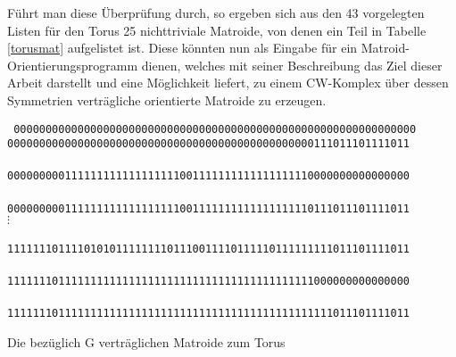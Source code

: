 Führt man diese Überprüfung durch, so ergeben sich aus den 43 vorgelegten
Listen für den Torus 25 nichttriviale Matroide, von denen ein Teil in Tabelle
\ref{torusmat} aufgelistet ist. Diese könnten nun als Eingabe für ein
Matroid-Orientierungsprogramm dienen, welches mit seiner Beschreibung das Ziel
dieser Arbeit darstellt und eine Möglichkeit liefert, zu einem CW-Komplex
über dessen Symmetrien verträgliche orientierte Matroide zu erzeugen.

\begin{table}[htb]
\begin{center}
{\scriptsize\tt
{}
000000000000000000000000000000000000000000000000000000000000000\\
000000000000000000000000000000000000000000000000111011101111011\\
\\
000000000111111111111111111001111111111111111110000000000000000\\
\\
000000000111111111111111111001111111111111111110111011101111011\\
\hline
$\vdots$\\
\\
111111101111010101111111101110011110111110111111111011101111011\\
\\
111111101111111111111111111111111111111111111111000000000000000\\
\\
111111101111111111111111111111111111111111111111111011101111011\\
\etab
}
\end{center}
\caption{Die bezüglich G verträglichen Matroide zum Torus}
\label{torusmat}
\end{table}

